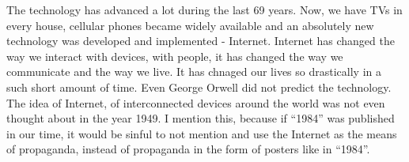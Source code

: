 \documentclass[a4paper,12pt]{article}
\begin{document}
The technology has advanced a lot during the last 69 years. Now, we have TVs in every house, cellular phones became widely available and an absolutely new technology was developed and implemented - Internet. Internet has changed the way we interact with devices, with people, it has changed the way we communicate and the way we live. It has chnaged our lives so drastically in a such short amount of time. Even George Orwell did not predict the technology. The idea of Internet, of interconnected devices around the world was not even thought about in the year 1949. I mention this, because if ``1984'' was published in our time, it would be sinful to not mention and use the Internet as the means of propaganda, instead of propaganda in the form of posters like in ``1984''.\\


\newpage


\end{document}
